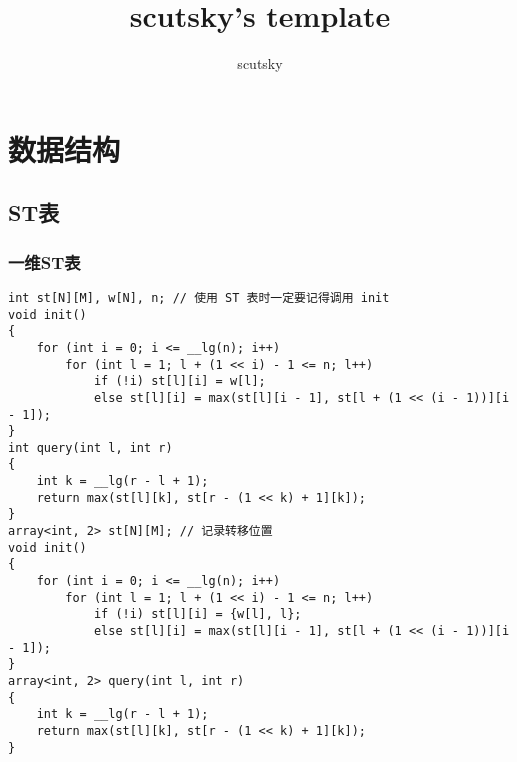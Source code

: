 \documentclass[a4paper, fontset=none]{ctexart}
\title{scutsky's template}
\author{scutsky}
\date{}
\begin{document}
\small
\begin{titlepage}
\maketitle
\end{titlepage}

\newpage
\pagestyle{empty}
\renewcommand{\contentsname}{目录}
\tableofcontents %
\newpage\clearpage
\newpage
\pagestyle{fancy}
\setcounter{page}{1}   %

\section{数据结构}
\subsection{ST表}
\subsubsection{一维ST表}
\begin{verbatim}
int st[N][M], w[N], n; // 使用 ST 表时一定要记得调用 init
void init()
{
    for (int i = 0; i <= __lg(n); i++)
        for (int l = 1; l + (1 << i) - 1 <= n; l++)
            if (!i) st[l][i] = w[l];
            else st[l][i] = max(st[l][i - 1], st[l + (1 << (i - 1))][i - 1]);
}
int query(int l, int r)
{
    int k = __lg(r - l + 1);
    return max(st[l][k], st[r - (1 << k) + 1][k]);
}
array<int, 2> st[N][M]; // 记录转移位置
void init()
{
    for (int i = 0; i <= __lg(n); i++)
        for (int l = 1; l + (1 << i) - 1 <= n; l++)
            if (!i) st[l][i] = {w[l], l};
            else st[l][i] = max(st[l][i - 1], st[l + (1 << (i - 1))][i - 1]);
}
array<int, 2> query(int l, int r)
{
    int k = __lg(r - l + 1);
    return max(st[l][k], st[r - (1 << k) + 1][k]);
}
\end{verbatim}
\end{document}
